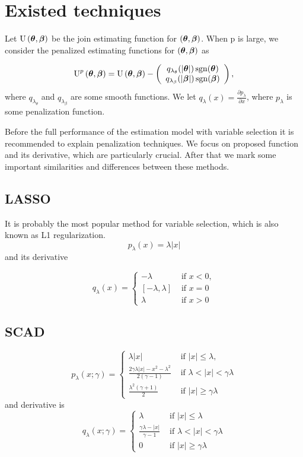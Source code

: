 \documentclass[
  letterpaper,
  DIV=11,
  numbers=noendperiod]{scrreprt}
\begin{document}
\section{Existed techniques}\label{existed-techniques}

Let \(\operatorname{U}\left(\boldsymbol{\theta}, \boldsymbol{\beta}\right)\) be the join
estimating function for \(\left(\boldsymbol{\theta}, \boldsymbol{\beta}\right)\). When p is
large, we consider the penalized estimating functions for
\(\left(\boldsymbol{\theta}, \boldsymbol{\beta}\right)\) as

\[
\operatorname{U}^p\left(\boldsymbol{\theta}, \boldsymbol{\beta}\right) = \operatorname{U}\left(\boldsymbol{\theta}, \boldsymbol{\beta}\right) -\left(\begin{array}{c}
q_{\lambda_\theta}(|\boldsymbol{\theta}|) \operatorname{sgn}(\boldsymbol{\theta}) \\
q_{\lambda_\beta}(|\boldsymbol{\beta}|) \operatorname{sgn}(\boldsymbol{\beta})
\end{array}\right),
\] where \(q_{\lambda_{\theta}}\) and \(q_{\lambda_{\beta}}\) are some
smooth functions. We let
\(q_{\lambda}\left(x\right) = \frac{\partial p_{\lambda}}{\partial x}\),
where \(p_{\lambda}\) is some penalization function.

Before the full performance of the estimation model with variable
selection it is recommended to explain penalization techniques. We focus
on proposed function and its derivative, which are particularly crucial.
After that we mark some important similarities and differences between
these methods.

\subsection{LASSO}\label{lasso}

It is probably the most popular method for variable selection, which is
also known as L1 regularization. \[
p_{\lambda}(x) = \lambda |x|
\] and its derivative

\[
q_{\lambda}(x)= \begin{cases} - \lambda & \text { if }x < 0, \\ \left[-\lambda, \lambda\right] & \text { if } x = 0 \\ \lambda & \text { if }x > 0\end{cases}
\]

\subsection{SCAD}\label{scad}

\[
p_{\lambda}(x ; \gamma)= \begin{cases}\lambda|x| & \text { if }|x| \leq \lambda, \\ \frac{2 \gamma \lambda|x|-x^2-\lambda^2}{2(\gamma-1)} & \text { if } \lambda<|x|<\gamma \lambda \\ \frac{\lambda^2(\gamma+1)}{2} & \text { if }|x| \geq \gamma \lambda\end{cases}
\] and derivative is \[
q_{\lambda}(x ;  \gamma)= \begin{cases}\lambda & \text { if }|x| \leq \lambda \\ \frac{\gamma \lambda-|x|}{\gamma-1} & \text { if } \lambda<|x|<\gamma \lambda \\ 0 & \text { if }|x| \geq \gamma \lambda\end{cases}
\]
\end{document}
